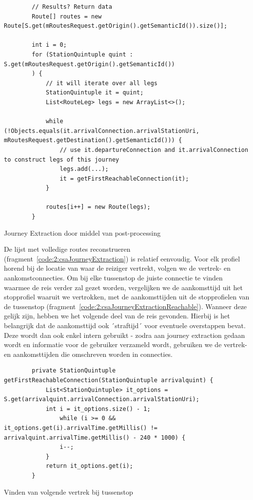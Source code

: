 \begin{listing}[h]
	\begin{verbatim}
		// Results? Return data
		Route[] routes = new Route[S.get(mRoutesRequest.getOrigin().getSemanticId()).size()];
		
		int i = 0;
		for (StationQuintuple quint : S.get(mRoutesRequest.getOrigin().getSemanticId())
		) {
			// it will iterate over all legs
			StationQuintuple it = quint;
			List<RouteLeg> legs = new ArrayList<>();
			
			while (!Objects.equals(it.arrivalConnection.arrivalStationUri, mRoutesRequest.getDestination().getSemanticId())) {
				// use it.departureConnection and it.arrivalConnection to construct legs of this journey
				legs.add(...);
				it = getFirstReachableConnection(it);
			}
			
			routes[i++] = new Route(legs);
		}
	\end{verbatim}
	\caption[CSA: Journey extraction]{Journey Extraction door middel van post-processing}
	\label{code:2:csaJourneyExtraction}
\end{listing}

De lijst met volledige routes reconstrueren (fragment~\ref{code:2:csaJourneyExtraction}) is relatief eenvoudig. Voor elk profiel horend bij de locatie van waar de reiziger vertrekt, volgen we de vertrek- en aankomstconnecties. Om bij elke tussenstop de juiste connectie te vinden waarmee de reis verder zal gezet worden, vergelijken we de aankomsttijd uit het stopprofiel waaruit we vertrokken, met de aankomsttijden uit de stopprofielen van de tussenstop (fragment~\ref{code:2:csaJourneyExtractionReachable}). Wanneer deze gelijk zijn, hebben we het volgende deel van de reis gevonden. Hierbij is het belangrijk dat de aankomsttijd ook ´straftijd´ voor eventuele overstappen bevat. Deze wordt dan ook enkel intern gebruikt - zodra aan journey extraction gedaan wordt en informatie voor de gebruiker verzameld wordt, gebruiken we de vertrek- en aankomsttijden die omschreven worden in connecties.

\begin{listing}[h]
	\begin{verbatim}
		private StationQuintuple getFirstReachableConnection(StationQuintuple arrivalquint) {
			List<StationQuintuple> it_options = S.get(arrivalquint.arrivalConnection.arrivalStationUri);
			int i = it_options.size() - 1;
				while (i >= 0 && it_options.get(i).arrivalTime.getMillis() != arrivalquint.arrivalTime.getMillis() - 240 * 1000) {
				i--;
			}
			return it_options.get(i);
		}
	\end{verbatim}
	\caption[CSA: Journey extraction bij tussenstops]{Vinden van volgende vertrek bij tussenstop}
	\label{code:2:csaJourneyExtractionReachable}
\end{listing}

